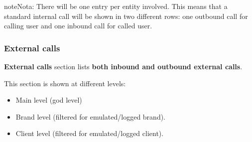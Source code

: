 \documentclass[letterpaper,10pt,spanish]{sphinxmanual}
\begin{document}
\begin{notice}{note}{Nota:}
There will be one entry per entity involved. This means that a standard internal call will be shown
in two different rows: one outbound call for calling user and one inbound call for called user.
\end{notice}


\subsubsection{External calls}
\label{administration_portal/client/residential/calls/external_calls:id1}\label{administration_portal/client/residential/calls/external_calls::doc}\label{administration_portal/client/residential/calls/external_calls:external-calls}
\textbf{External calls} section lists \textbf{both inbound and outbound external calls}.

This section is shown at different levels:
\begin{itemize}
\item {} 
Main level (god level)

\item {} 
Brand level (filtered for emulated/logged brand).

\item {} 
Client level (filtered for emulated/logged client).

\end{itemize}
\end{document}

